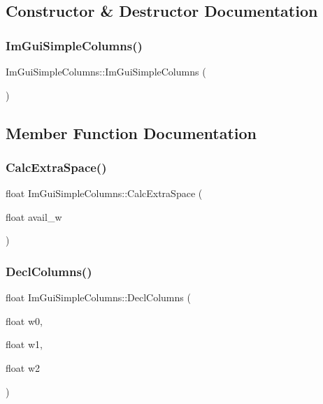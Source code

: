\subsection{Constructor \& Destructor Documentation}
\hypertarget{struct_im_gui_simple_columns_ac299fa0dc0a471dc8ee3a9f97a67e444}{}\label{struct_im_gui_simple_columns_ac299fa0dc0a471dc8ee3a9f97a67e444} 
\subsubsection{\texorpdfstring{Im\+Gui\+Simple\+Columns()}{ImGuiSimpleColumns()}}
{\footnotesize\ttfamily Im\+Gui\+Simple\+Columns\+::\+Im\+Gui\+Simple\+Columns (\begin{DoxyParamCaption}{ }\end{DoxyParamCaption})}



\subsection{Member Function Documentation}
\hypertarget{struct_im_gui_simple_columns_aeebfea369d5f37b99f02ecd9ab2187ee}{}\label{struct_im_gui_simple_columns_aeebfea369d5f37b99f02ecd9ab2187ee} 
\subsubsection{\texorpdfstring{Calc\+Extra\+Space()}{CalcExtraSpace()}}
{\footnotesize\ttfamily float Im\+Gui\+Simple\+Columns\+::\+Calc\+Extra\+Space (\begin{DoxyParamCaption}\item[{float}]{avail\+\_\+w }\end{DoxyParamCaption})}

\hypertarget{struct_im_gui_simple_columns_a2daac4e4973ea1e9f2dda655206796fc}{}\label{struct_im_gui_simple_columns_a2daac4e4973ea1e9f2dda655206796fc} 
\subsubsection{\texorpdfstring{Decl\+Columns()}{DeclColumns()}}
{\footnotesize\ttfamily float Im\+Gui\+Simple\+Columns\+::\+Decl\+Columns (\begin{DoxyParamCaption}\item[{float}]{w0,  }\item[{float}]{w1,  }\item[{float}]{w2 }\end{DoxyParamCaption})}

